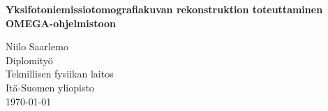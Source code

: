 \begin{titlepage}
    \vspace*{2.1in}
    \begin{center}
        \begin{spacing}{2}
        \textbf{
            \Huge Yksifotoniemissiotomografiakuvan rekonstruktion toteuttaminen OMEGA-ohjelmistoon
        }
        \end{spacing}
    \end{center}
    \vspace*{\fill}
    
    \hspace{.5\textwidth}\parbox{.5\textwidth}{
        Niilo Saarlemo
        \vspace*{1pt}\\%
        Diplomityö
        \vspace*{1pt}\\%
        Teknillisen fysiikan laitos
        \vspace*{1pt}\\%
        Itä-Suomen yliopisto
        \vspace*{1pt}\\%
        \today{}
    }
\end{titlepage}